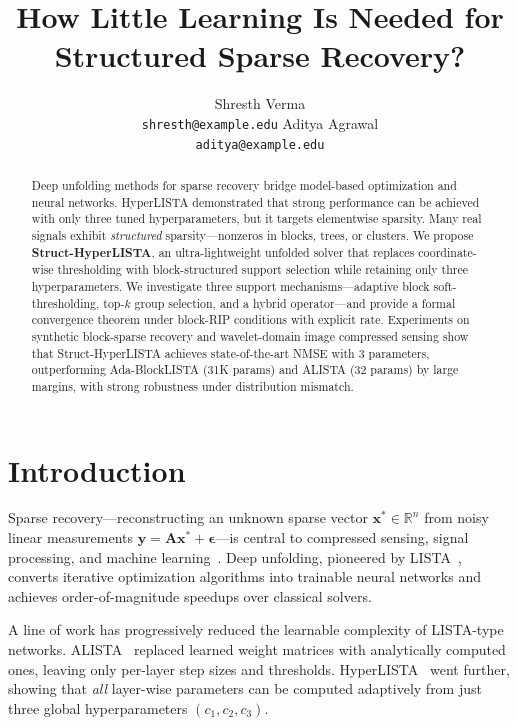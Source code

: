 \documentclass{article}
\title{How Little Learning Is Needed for Structured Sparse Recovery?}
\author{
  Shresth Verma \\
  \texttt{shresth@example.edu}
  \And
  Aditya Agrawal \\
  \texttt{aditya@example.edu}
}
\begin{document}
\maketitle

\begin{abstract}
Deep unfolding methods for sparse recovery bridge model-based optimization and neural networks. HyperLISTA demonstrated that strong performance can be achieved with only three tuned hyperparameters, but it targets elementwise sparsity. Many real signals exhibit \emph{structured} sparsity---nonzeros in blocks, trees, or clusters. We propose \textbf{Struct-HyperLISTA}, an ultra-lightweight unfolded solver that replaces coordinate-wise thresholding with block-structured support selection while retaining only three hyperparameters. We investigate three support mechanisms---adaptive block soft-thresholding, top-$k$ group selection, and a hybrid operator---and provide a formal convergence theorem under block-RIP conditions with explicit rate. Experiments on synthetic block-sparse recovery and wavelet-domain image compressed sensing show that Struct-HyperLISTA achieves state-of-the-art NMSE with 3 parameters, outperforming Ada-BlockLISTA (31K params) and ALISTA (32 params) by large margins, with strong robustness under distribution mismatch.
\end{abstract}

\section{Introduction}

Sparse recovery---reconstructing an unknown sparse vector $\mathbf{x}^* \in \mathbb{R}^n$ from noisy linear measurements $\mathbf{y} = \mathbf{A}\mathbf{x}^* + \boldsymbol{\epsilon}$---is central to compressed sensing, signal processing, and machine learning~\cite{candes2006rip,tibshirani1996lasso}. Deep unfolding, pioneered by LISTA~\cite{gregor2010lista}, converts iterative optimization algorithms into trainable neural networks and achieves order-of-magnitude speedups over classical solvers.

A line of work has progressively reduced the learnable complexity of LISTA-type networks. ALISTA~\cite{liu2019alista} replaced learned weight matrices with analytically computed ones, leaving only per-layer step sizes and thresholds. HyperLISTA~\cite{chen2021hyperlista} went further, showing that \emph{all} layer-wise parameters can be computed adaptively from just three global hyperparameters $(c_1, c_2, c_3)$.
\end{document}
